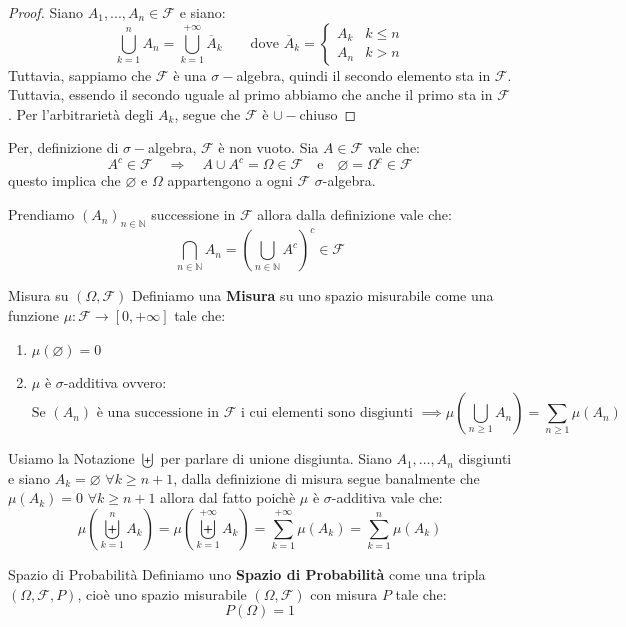 \documentclass[11pt, a4paper, twoside]{article}
\begin{document}
\begin{proof}
	Siano $A_1,...,A_n \in \mathcal F$ e siano:
	\[
		\bigcup_{k=1}^n A_n = \bigcup_{k=1}^{+\infty} \overline A_k \qquad \text{dove } \overline A_k =
		\begin{cases}
			A_k & k\leq n\\
			A_n & k>n
		\end{cases}
	\]
	Tuttavia, sappiamo che $\mathcal F$ è una $\sigma-$algebra, quindi il secondo elemento sta in $\mathcal F$. Tuttavia, essendo il secondo uguale al primo abbiamo che anche il primo sta in $\mathcal F$. Per l'arbitrarietà degli $A_k$, segue che $\mathcal F$ è $\cup-$chiuso
\end{proof}
\begin{oss}
	Per, definizione di $\sigma-$algebra, $\mathcal F$ è non vuoto. Sia $A\in\mathcal F$ vale che:
	\[
		A^c  \in \mathcal F \quad\Rightarrow\quad A\cup A^c=\Omega\in \mathcal F \quad \text{e} \quad \varnothing=\Omega^c\in \mathcal F
	\]
questo implica che $\varnothing$ e $\Omega$ appartengono a ogni $\mathcal F$ $\sigma$-algebra.
\end{oss}
\begin{oss}
	Prendiamo $(A_n)_{n \in \mathbb N}$ successione in $\mathcal F$ allora dalla definizione vale che:
	\[
		\bigcap\limits_{n\in\mathbb{N}} A_n=\left(\bigcup\limits_{n\in\mathbb{N}}A^c\right)^c\in\mathcal F
	\]
\end{oss}
\begin{defn}{Misura su $(\Omega,\mathcal F)$}{}
	Definiamo una \textbf{Misura} su uno spazio misurabile come una funzione $\mu:\mathcal F\rightarrow[0,+\infty]$ tale che:
	\begin{enumerate}
		\item $\mu(\varnothing)=0$
		\item $\mu$ è $\sigma$-additiva ovvero:
		\[
			\text{Se }(A_n) \text{ è una successione in }\mathcal F \text{ i cui elementi sono disgiunti } \implies\mu\left(\bigcup\limits_{n\geq1}A_n\right)=\sum\limits_{n\geq1}\mu\left(A_n\right)
		\]
	\end{enumerate}
\end{defn}
\begin{oss}
	Usiamo la Notazione $\biguplus$ per parlare di unione disgiunta. Siano $A_1,\dots,A_n$ disgiunti e siano $A_k=\varnothing$ $\forall k\geq n+1$, dalla definizione di misura segue banalmente che $\mu(A_k)=0$ $\forall k\geq n+1$ allora dal fatto poichè $\mu$ è $\sigma$-additiva vale che:
	\[
		\mu\left(\biguplus\limits_{k=1}^n A_k\right)=\mu\left(\biguplus\limits_{k=1}^{+\infty} A_k\right)=\sum\limits_{k=1}^{+\infty}\mu(A_k)=\sum\limits_{k=1}^n\mu(A_k)
	\]
\end{oss}
\begin{defn}{Spazio di Probabilità}{}
	Definiamo uno \textbf{Spazio di Probabilità} come una tripla $(\Omega,\mathcal F, P)$, cioè uno spazio misurabile $(\Omega,\mathcal F)$ con misura $P$ tale che:
	\[
		P(\Omega)= 1
	\]
\end{defn}
\end{document}
